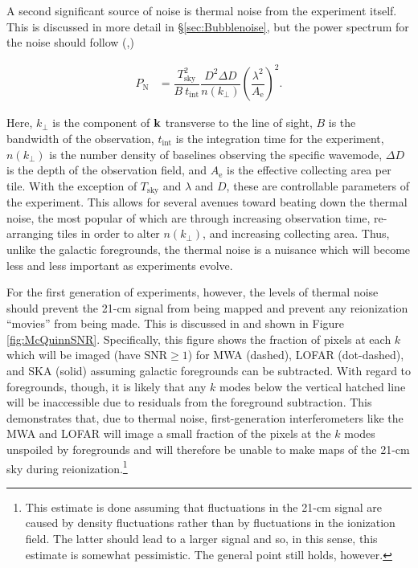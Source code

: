 A second significant source of noise is thermal noise from the experiment itself. This is discussed in more detail in \S \ref{sec:Bubblenoise}, but the power spectrum for the noise should follow (\citealt{McQuinn2006},\citealt{Furlanetto2006})

\begin{align}
P_{\text{N}} &= \dfrac{T_{\text{sky}}^{2}}{B\ t_{\text{int}}} \dfrac{D^{2}\Delta D}{n(k_{\perp})}\left( \dfrac{\lambda^{2}}{A_{\text{e}}} \right)^{2}.
\end{align}

Here, $k_{\perp}$ is the component of ${\bf k}$ transverse to the line of sight, $B$ is the bandwidth of the observation, $t_{\text{int}}$ is the integration time for the experiment, $n(k_{\perp})$ is the number density of baselines observing the specific wavemode, $\Delta D$ is the depth of the observation field, and $A_{\text{e}}$ is the effective collecting area per tile. With the exception of $T_{\text{sky}}$ and $\lambda$ and $D$, these are controllable parameters of the experiment. This allows for several avenues toward beating down the thermal noise, the most popular of which are through increasing observation time, re-arranging tiles in order to alter $n(k_{\perp})$, and increasing collecting area. Thus, unlike the galactic foregrounds, the thermal noise is a nuisance which will become less and less important as experiments evolve. 


For the first generation of experiments, however, the levels of thermal noise should prevent the 21-cm signal from being mapped and prevent any reionization ``movies'' from being made. This is discussed in \cite{McQuinn2006} and shown in Figure \ref{fig:McQuinnSNR}. Specifically, this figure shows the fraction of pixels at each $k$ which will be imaged (have $\text{SNR} \geq 1$) for MWA (dashed), LOFAR (dot-dashed), and SKA (solid) assuming galactic foregrounds can be subtracted. With regard to foregrounds, though, it is likely that any $k$ modes below the vertical hatched line will be inaccessible due to residuals from the foreground subtraction. This demonstrates that, due to thermal noise, first-generation interferometers like the MWA and LOFAR will image a small fraction of the pixels at the $k$ modes unspoiled by foregrounds and will therefore be unable to make maps of the 21-cm sky during reionization.\footnote{This estimate is done assuming that fluctuations in the 21-cm signal are caused by density fluctuations rather than by fluctuations in the ionization field. The latter should lead to a larger signal and so, in this sense, this estimate is somewhat pessimistic. The general point still holds, however.} 


